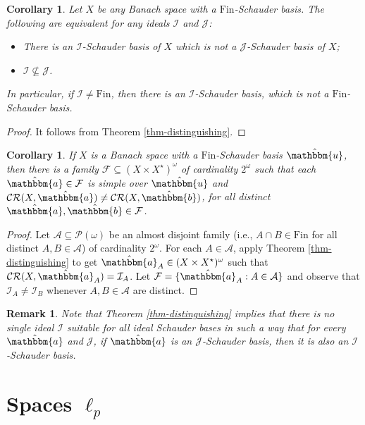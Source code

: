 \documentclass{amsart}
\newcommand{\I}{\mathcal{I}}
\newcommand{\J}{\mathcal{J}}
\newcommand{\Fin}{\mathrm{Fin}}
\newcommand{\CR}{\mathcal{CR}}
\newcommand{\w}{\mathbbm}
\newtheorem{remark}[theorem]{Remark}
\newtheorem{corollary}[theorem]{Corollary}
\begin{document}
\begin{corollary}
Let $X$ be any Banach space with a $\Fin$-Schauder basis. The following are equivalent for any ideals $\I$ and $\J$:
\begin{itemize}
    \item[(a)] There is an $\I$-Schauder basis of $X$ which is not a $\J$-Schauder basis of $X$;
    \item[(b)] $\I\not\subseteq\J$.
\end{itemize}
In particular, if $\I\neq\Fin$, then there is an $\I$-Schauder basis, which is not a $\Fin$-Schauder basis.
\end{corollary}

\begin{proof}
It follows from Theorem \ref{thm-distinguishing}.
\end{proof}

\begin{corollary}
If $X$ is a Banach space with a $\Fin$-Schauder basis $\hat{\w{u}}$, then there is a family $\mathcal{F}\subseteq(X\times X^\star)^\omega$ of cardinality $2^\omega$ such that each $\hat{\w{a}}\in\mathcal{F}$ is simple over $\hat{\w{u}}$ and $\CR(X,\hat{\w{a}})\neq\CR(X,\hat{\w{b}})$, for all distinct $\hat{\w{a}},\hat{\w{b}}\in\mathcal{F}$. 
\end{corollary}

\begin{proof}
Let $\mathcal{A}\subseteq\mathcal{P}(\omega)$ be an almost disjoint family (i.e., $A\cap B\in\Fin$ for all distinct $A,B\in\mathcal{A}$) of cardinality $2^\omega$. For each $A\in\mathcal{A}$, apply Theorem \ref{thm-distinguishing} to get $\hat{\w{a}}_A\in(X\times X^\star)^\omega$ such that $\CR(X,\hat{\w{a}}_A)=\I_A$. Let $\mathcal{F}=\{\hat{\w{a}}_A: A\in\mathcal{A}\}$ and observe that $\I_A\neq\I_B$ whenever $A,B\in\mathcal{A}$ are distinct.
\end{proof}

\begin{remark}
Note that Theorem \ref{thm-distinguishing} implies that there is no single ideal $\I$ suitable for all ideal Schauder bases in such a way that for every $\hat{\w{a}}$ and $\J$, if $\hat{\w{a}}$ is an $\J$-Schauder basis, then it is also an $\I$-Schauder basis.
\end{remark}

\section{Spaces \texorpdfstring{$\ell_p$}{l }}
\end{document}
